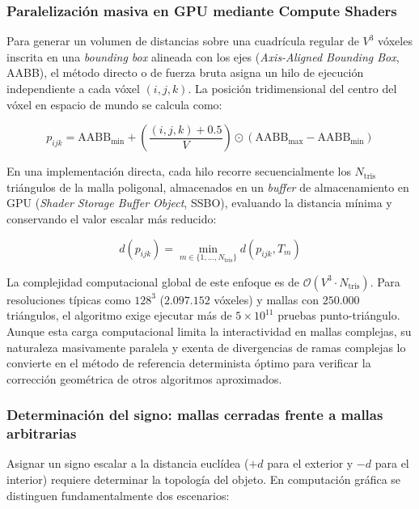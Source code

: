 \subsubsection{Paralelización masiva en GPU mediante Compute Shaders}

Para generar un volumen de distancias sobre una cuadrícula regular de $V^3$ vóxeles inscrita en una \textit{bounding box} alineada con los ejes (\textit{Axis-Aligned Bounding Box}, AABB), el método directo o de fuerza bruta asigna un hilo de ejecución independiente a cada vóxel $(i, j, k)$. La posición tridimensional del centro del vóxel en espacio de mundo se calcula como:

\begin{equation}
  p_{ijk} = \text{AABB}_{\min} + \left( \frac{(i, j, k) + 0.5}{V} \right) \odot (\text{AABB}_{\max} - \text{AABB}_{\min})
\end{equation}

En una implementación directa, cada hilo recorre secuencialmente los $N_{\text{tris}}$ triángulos de la malla poligonal, almacenados en un \textit{buffer} de almacenamiento en GPU (\textit{Shader Storage Buffer Object}, SSBO), evaluando la distancia mínima y conservando el valor escalar más reducido:

\begin{equation}
  d(p_{ijk}) = \min_{m \in \{1, \dots, N_{\text{tris}}\}} d(p_{ijk}, T_m)
\end{equation}

La complejidad computacional global de este enfoque es de $\mathcal{O}(V^3 \cdot N_{\text{tris}})$. Para resoluciones típicas como $128^3$ ($2.097.152$ vóxeles) y mallas con $250.000$ triángulos, el algoritmo exige ejecutar más de $5 \times 10^{11}$ pruebas punto-triángulo. Aunque esta carga computacional limita la interactividad en mallas complejas, su naturaleza masivamente paralela y exenta de divergencias de ramas complejas lo convierte en el método de referencia determinista óptimo para verificar la corrección geométrica de otros algoritmos aproximados.

\subsubsection{Determinación del signo: mallas cerradas frente a mallas arbitrarias}

Asignar un signo escalar a la distancia euclídea ($+d$ para el exterior y $-d$ para el interior) requiere determinar la topología del objeto. En computación gráfica se distinguen fundamentalmente dos escenarios:

